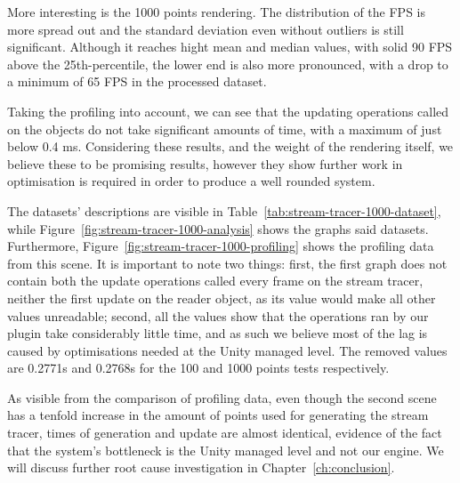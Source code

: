 More interesting is the 1000 points rendering. The distribution of the FPS is more spread out and the standard deviation even without outliers is still significant. Although it reaches hight mean and median values, with solid 90 FPS above the 25th-percentile, the lower end is also more pronounced, with a drop to a minimum of 65 FPS in the processed dataset.

Taking the profiling into account, we can see that the updating operations called on the objects do not take significant amounts of time, with a maximum of just below 0.4 ms. Considering these results, and the weight of the rendering itself, we believe these to be promising results, however they show further work in optimisation is required in order to produce a well rounded system.

The datasets' descriptions are visible in Table~\ref{tab:stream-tracer-1000-dataset}, while Figure~\ref{fig:stream-tracer-1000-analysis} shows the graphs said datasets. Furthermore, Figure~\ref{fig:stream-tracer-1000-profiling} shows the profiling data from this scene. It is important to note two things: first, the first graph does not contain both the update operations called every frame on the stream tracer, neither the first update on the reader object, as its value would make all other values unreadable; second, all the values show that the operations ran by our plugin take considerably little time, and as such we believe most of the lag is caused by optimisations needed at the Unity managed level. The removed values are 0.2771s and 0.2768s for the 100 and 1000 points tests respectively.

As visible from the comparison of profiling data, even though the second scene has a tenfold increase in the amount of points used for generating the stream tracer, times of generation and update are almost identical, evidence of the fact that the system's bottleneck is the Unity managed level and not our engine. We will discuss further root cause investigation in Chapter~\ref{ch:conclusion}.

